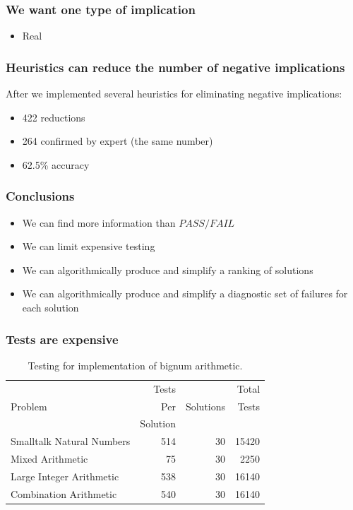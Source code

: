 \documentclass[svgnames,14pt]{beamer}
\newcommand\fail{\mathit{FAIL}}
\newcommand\pass{\mathit{PASS}}
\theoremstyle{definition}
\begin{document}
\begin{frame}
\frametitle{We want one type of implication}
\begin{itemize}
\item Real
\end{itemize}
\end{frame}

\begin{frame}
\frametitle{Heuristics can reduce the number of negative implications}
After we implemented several heuristics for eliminating negative implications:
\begin{itemize}
\item 422 reductions
\item 264 confirmed by expert (the same number)
\item 62.5\% accuracy
\end{itemize}
\end{frame}

\begin{frame}
\frametitle{Conclusions}
\begin{itemize}
\item We can find more information than $\pass/\fail$
\item We can limit expensive testing
\item We can algorithmically produce and simplify a ranking of solutions
\item We can algorithmically produce and simplify a diagnostic set of failures for each solution
\end{itemize}
\end{frame}

\begin{frame}
\frametitle{Tests are expensive}
\begin{table}
\begin{tabular}{| l | r | r | r |}
\hline
 & Tests & & Total \\
Problem & Per & Solutions & Tests \\
 & Solution & &  \\
\hline
Smalltalk Natural Numbers & 514 & 30 & 15420 \\
Mixed Arithmetic & 75 & 30 & 2250 \\
Large Integer Arithmetic & 538 & 30 & 16140 \\
Combination Arithmetic & 540 & 30 & 16140 \\
\hline
\end{tabular}
\caption{Testing for implementation of bignum arithmetic.}
\end{table}
\end{frame}
\end{document}
